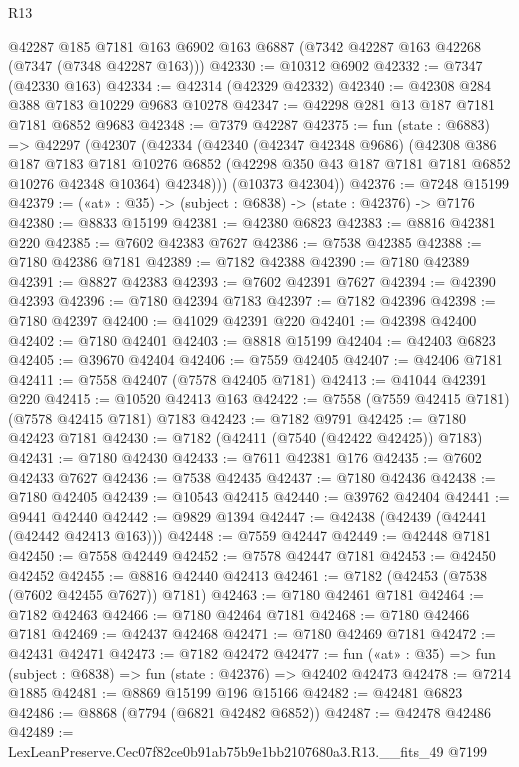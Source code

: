 \begin{lexlean}{R13}
\begin{coremodule}
    @42287
    @185
    @7181
    @163
    @6902
    @163
    @6887
    (@7342 @42287 @163 @42268 (@7347 (@7348 @42287 @163)))
@42330 := @10312 @6902
@42332 := @7347 (@42330 @163)
@42334 := @42314 (@42329 @42332)
@42340 := @42308 @284 @388 @7183 @10229 @9683 @10278
@42347 := @42298 @281 @13 @187 @7181 @7181 @6852 @9683
@42348 := @7379 @42287
@42375 := fun (state : @6883) =>
  @42297
    (@42307
      (@42334
        (@42340
          (@42347 @42348 @9686)
          (@42308
            @386
            @187
            @7183
            @7181
            @10276
            @6852
            (@42298 @350 @43 @187 @7181 @7181 @6852 @10276 @42348 @10364)
            @42348)))
      (@10373 @42304))
@42376 := @7248 @15199
@42379 := («at» : @35) -> (subject : @6838) -> (state : @42376) -> @7176
@42380 := @8833 @15199
@42381 := @42380 @6823
@42383 := @8816 @42381 @220
@42385 := @7602 @42383 @7627
@42386 := @7538 @42385
@42388 := @7180 @42386 @7181
@42389 := @7182 @42388
@42390 := @7180 @42389
@42391 := @8827 @42383
@42393 := @7602 @42391 @7627
@42394 := @42390 @42393
@42396 := @7180 @42394 @7183
@42397 := @7182 @42396
@42398 := @7180 @42397
@42400 := @41029 @42391 @220
@42401 := @42398 @42400
@42402 := @7180 @42401
@42403 := @8818 @15199
@42404 := @42403 @6823
@42405 := @39670 @42404
@42406 := @7559 @42405
@42407 := @42406 @7181
@42411 := @7558 @42407 (@7578 @42405 @7181)
@42413 := @41044 @42391 @220
@42415 := @10520 @42413 @163
@42422 := @7558 (@7559 @42415 @7181) (@7578 @42415 @7181) @7183
@42423 := @7182 @9791
@42425 := @7180 @42423 @7181
@42430 := @7182 (@42411 (@7540 (@42422 @42425)) @7183)
@42431 := @7180 @42430
@42433 := @7611 @42381 @176
@42435 := @7602 @42433 @7627
@42436 := @7538 @42435
@42437 := @7180 @42436
@42438 := @7180 @42405
@42439 := @10543 @42415
@42440 := @39762 @42404
@42441 := @9441 @42440
@42442 := @9829 @1394
@42447 := @42438 (@42439 (@42441 (@42442 @42413 @163)))
@42448 := @7559 @42447
@42449 := @42448 @7181
@42450 := @7558 @42449
@42452 := @7578 @42447 @7181
@42453 := @42450 @42452
@42455 := @8816 @42440 @42413
@42461 := @7182 (@42453 (@7538 (@7602 @42455 @7627)) @7181)
@42463 := @7180 @42461 @7181
@42464 := @7182 @42463
@42466 := @7180 @42464 @7181
@42468 := @7180 @42466 @7181
@42469 := @42437 @42468
@42471 := @7180 @42469 @7181
@42472 := @42431 @42471
@42473 := @7182 @42472
@42477 := fun («at» : @35) => fun (subject : @6838) => fun (state : @42376) => @42402 @42473
@42478 := @7214 @1885
@42481 := @8869 @15199 @196 @15166
@42482 := @42481 @6823
@42486 := @8868 (@7794 (@6821 @42482 @6852))
@42487 := @42478 @42486
@42489 := LexLeanPreserve.Cec07f82ce0b91ab75b9e1bb2107680a3.R13.__fits_49 @7199

\end{coremodule}
\end{lexlean}
